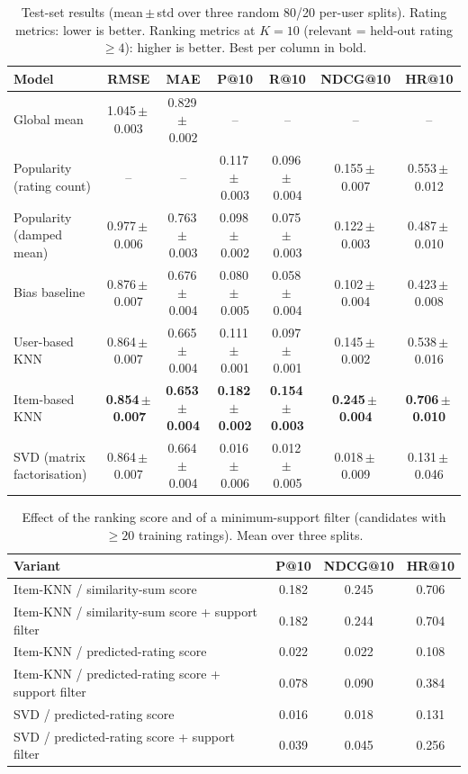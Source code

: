 \begin{table}[t]
\centering
\caption{Test-set results (mean\,$\pm$\,std over three random 80/20 per-user splits). Rating metrics: lower is better. Ranking metrics at $K{=}10$ (relevant = held-out rating $\geq 4$): higher is better. Best per column in bold.}
\label{tab:main}
\small
\begin{tabular}{lcccccc}
\toprule
Model & RMSE & MAE & P@10 & R@10 & NDCG@10 & HR@10 \\
\midrule
Global mean & 1.045\,$\pm$\,0.003 & 0.829\,$\pm$\,0.002 & -- & -- & -- & -- \\
Popularity (rating count) & -- & -- & 0.117\,$\pm$\,0.003 & 0.096\,$\pm$\,0.004 & 0.155\,$\pm$\,0.007 & 0.553\,$\pm$\,0.012 \\
Popularity (damped mean) & 0.977\,$\pm$\,0.006 & 0.763\,$\pm$\,0.003 & 0.098\,$\pm$\,0.002 & 0.075\,$\pm$\,0.003 & 0.122\,$\pm$\,0.003 & 0.487\,$\pm$\,0.010 \\
Bias baseline & 0.876\,$\pm$\,0.007 & 0.676\,$\pm$\,0.004 & 0.080\,$\pm$\,0.005 & 0.058\,$\pm$\,0.004 & 0.102\,$\pm$\,0.004 & 0.423\,$\pm$\,0.008 \\
User-based KNN & 0.864\,$\pm$\,0.007 & 0.665\,$\pm$\,0.004 & 0.111\,$\pm$\,0.001 & 0.097\,$\pm$\,0.001 & 0.145\,$\pm$\,0.002 & 0.538\,$\pm$\,0.016 \\
Item-based KNN & \textbf{0.854\,$\pm$\,0.007} & \textbf{0.653\,$\pm$\,0.004} & \textbf{0.182\,$\pm$\,0.002} & \textbf{0.154\,$\pm$\,0.003} & \textbf{0.245\,$\pm$\,0.004} & \textbf{0.706\,$\pm$\,0.010} \\
SVD (matrix factorisation) & 0.864\,$\pm$\,0.007 & 0.664\,$\pm$\,0.004 & 0.016\,$\pm$\,0.006 & 0.012\,$\pm$\,0.005 & 0.018\,$\pm$\,0.009 & 0.131\,$\pm$\,0.046 \\
\bottomrule
\end{tabular}
\end{table}

\begin{table}[t]
\centering
\caption{Effect of the ranking score and of a minimum-support filter (candidates with $\geq 20$ training ratings). Mean over three splits.}
\label{tab:ablation}
\footnotesize
\setlength{\tabcolsep}{3pt}
\begin{tabular}{lccc}
\toprule
Variant & P@10 & NDCG@10 & HR@10 \\
\midrule
Item-KNN / similarity-sum score & 0.182 & 0.245 & 0.706 \\
Item-KNN / similarity-sum score + support filter & 0.182 & 0.244 & 0.704 \\
Item-KNN / predicted-rating score & 0.022 & 0.022 & 0.108 \\
Item-KNN / predicted-rating score + support filter & 0.078 & 0.090 & 0.384 \\
SVD / predicted-rating score & 0.016 & 0.018 & 0.131 \\
SVD / predicted-rating score + support filter & 0.039 & 0.045 & 0.256 \\
\bottomrule
\end{tabular}
\end{table}
